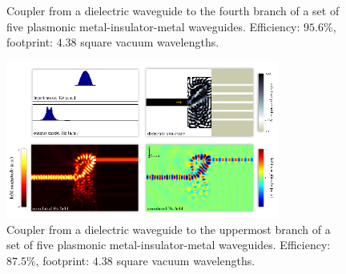 \documentclass[letterpaper,10pt]{article}
\begin{document}
\begin{appendix}
\begin{figure}[h!]
    \caption{
        Coupler from a dielectric waveguide to the 
            fourth branch of a set of five plasmonic 
            metal-insulator-metal waveguides.
        Efficiency: $95.6\%$,
        footprint: $4.38$ square vacuum wavelengths.
        }
\end{figure}
\begin{figure}[h!]
    \centering
    \includegraphics[width=0.8\textwidth]{21}
    \caption{
        Coupler from a dielectric waveguide to the 
            uppermost branch of a set of five plasmonic 
            metal-insulator-metal waveguides.
        Efficiency: $87.5\%$,
        footprint: $4.38$ square vacuum wavelengths.
        }
\end{figure}
\clearpage
\end{appendix}
\end{document}
